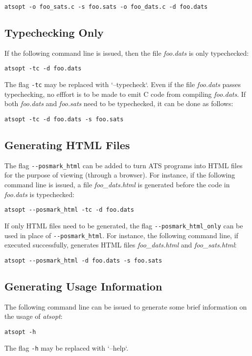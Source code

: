 \begin{verbatim}
atsopt -o foo_sats.c -s foo.sats -o foo_dats.c -d foo.dats
\end{verbatim}

\subsection{Typechecking Only}
If the following command line is issued, then the file {\it foo.dats} is
only typechecked:
\begin{verbatim}
atsopt -tc -d foo.dats
\end{verbatim}
The flag \verb`-tc` may be replaced with `--typecheck`.  Even if the file
{\it foo.dats} passes typechecking, no efffort is to be made to emit C code
from compiling {\it foo.dats}. If both {\it foo.dats} and {\it foo.sats}
need to be typechecked, it can be done as follows:
\begin{verbatim}
atsopt -tc -d foo.dats -s foo.sats
\end{verbatim}

\subsection{Generating HTML Files}
The flag \verb`--posmark_html` can be added to turn ATS programs into HTML
files for the purpose of viewing (through a browser). For instance, if the
following command line is issued, a file {\it foo\_dats.html} is generated
before the code in {\it foo.dats} is typechecked:
\begin{verbatim}
atsopt --posmark_html -tc -d foo.dats
\end{verbatim}
If only HTML files need to be generated,
the flag \verb`--posmark_html_only` can be used in place of
\verb`--posmark_html`. For instance, the following command line,
if executed successfully, generates HTML files {\it foo\_dats.html} and
{\it foo\_sats.html}:
\begin{verbatim}
atsopt --posmark_html -d foo.dats -s foo.sats
\end{verbatim}

\subsection{Generating Usage Information}
The following command line can be issued to generate some brief information
on the usage of {\it atsopt}:
\begin{verbatim}
atsopt -h
\end{verbatim}
The flag \verb`-h` may be replaced with `--help`.

